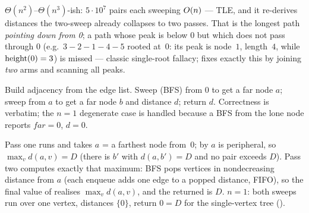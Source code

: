 \begin{thinkbox}
{$\Theta(n^2)$--$\Theta(n^3)$-ish: $5\cdot 10^7$ pairs each sweeping $O(n)$ ---
TLE, and it re-derives distances the two-sweep already collapses to two passes.}
{That is the longest path \emph{pointing down from 0}; a path whose peak is below 0 but
which does not pass through 0 (e.g.\ $3-2-1-4-5$ rooted at~$0$: its peak is node~$1$,
length~$4$, while $\operatorname{height}(0)=3$) is missed --- classic single-root fallacy;
 fixes exactly this by joining \emph{two} arms and scanning all peaks.}
\end{thinkbox}

Build adjacency from the edge list. Sweep (BFS) from $0$ to get a far node $a$; sweep
from $a$ to get a far node $b$ and distance $d$; return $d$. Correctness is
 verbatim; the $n=1$ degenerate case is handled because a BFS from
the lone node reports $\mathit{far}=0$, $d=0$.

\begin{proofbox}
Pass one runs  and takes $a$ = a farthest node from~$0$; by
 $a$ is peripheral, so $\max_v d(a,v) = D$ (there is $b'$ with
$d(a,b')=D$ and no pair exceeds $D$). Pass two computes exactly that maximum: BFS pops
vertices in nondecreasing distance from $a$ (each enqueue adds one edge to a popped
distance, FIFO), so the final value of  realises $\max_v d(a,v)$, and the
returned  is $D$. $n=1$: both sweeps run over one vertex, distances $\{0\}$,
return $0 = D$ for the single-vertex tree ().
\end{proofbox}

